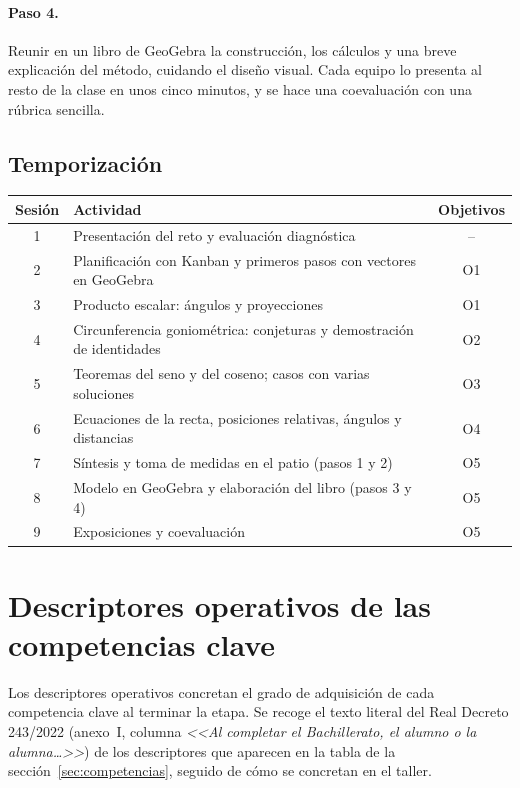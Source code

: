 \documentclass[11pt,a4paper]{article}
\begin{document}
\paragraph{Paso 4.} Reunir en un libro de GeoGebra la construcción, los
cálculos y una breve explicación del método, cuidando el diseño visual. Cada
equipo lo presenta al resto de la clase en unos cinco minutos, y se hace una
coevaluación con una rúbrica sencilla.

\subsection{Temporización}
{\small
\renewcommand{\arraystretch}{1.25}
\begin{tabularx}{\linewidth}{c >{\raggedright\arraybackslash}X c}
\toprule
\textbf{Sesión} & \textbf{Actividad} & \textbf{Objetivos} \\
\midrule
1 & Presentación del reto y evaluación diagnóstica & -- \\
2 & Planificación con Kanban y primeros pasos con vectores en GeoGebra & O1 \\
3 & Producto escalar: ángulos y proyecciones & O1 \\
4 & Circunferencia goniométrica: conjeturas y demostración de identidades & O2 \\
5 & Teoremas del seno y del coseno; casos con varias soluciones & O3 \\
6 & Ecuaciones de la recta, posiciones relativas, ángulos y distancias & O4 \\
7 & Síntesis y toma de medidas en el patio (pasos 1 y 2) & O5 \\
8 & Modelo en GeoGebra y elaboración del libro (pasos 3 y 4) & O5 \\
9 & Exposiciones y coevaluación & O5 \\
\bottomrule
\end{tabularx}
}

\clearpage
\appendix
\renewcommand{\thesection}{\Alph{section}}
\section{Descriptores operativos de las competencias clave}
\label{anexo:descriptores}
Los descriptores operativos concretan el grado de adquisición de cada
competencia clave al terminar la etapa. Se recoge el texto literal del Real
Decreto 243/2022 (anexo~I, columna \emph{<<Al completar el Bachillerato, el
alumno o la alumna\ldots>>}) de los descriptores que aparecen en la tabla de
la sección~\ref{sec:competencias}, seguido de cómo se concretan en el taller.
\end{document}

